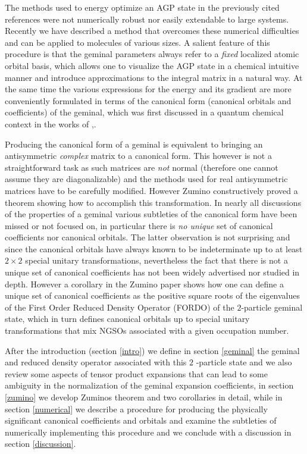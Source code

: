 \documentclass[aps,preprint]{revtex4}%
\begin{document}
The methods used to energy optimize an AGP state in the previously cited
references were not numerically robust nor easily extendable to large systems.
Recently we have \cite{Weiner&Ortiz02} described a method that overcomes these
numerical difficulties and can be applied to molecules of various sizes. A
salient feature of this procedure is that the geminal parameters always refer
to a \emph{fixed} localized atomic orbital basis, which allows one to
visualize the AGP state in a chemical intuitive manner and introduce
approximations to the integral matrix in a natural way. At the same time the
various expressions for the energy and its gradient are more conveniently
formulated in terms of the canonical form (canonical orbitals and
coefficients) of the geminal, which was first discussed in a quantum chemical
context in the works of \cite{Coleman63},\cite{Lowdin56}.

Producing the canonical form of a geminal is equivalent to bringing an
antisymmetric \emph{complex} matrix to a canonical form. This however is not a
straightforward task as such matrices are \emph{not }normal \cite{Encyclo}
(therefore one cannot assume they are diagonalizable) and the methods used for
real antisymmetric matrices have to be carefully modified. However Zumino
\cite{Zumino62} constructively proved a theorem showing how to accomplish this
transformation. In nearly all discussions of the properties of a geminal
various subtleties of the canonical form have been missed or not focused on,
in particular there is \emph{no unique} set of canonical coefficients nor
canonical orbitals. The latter observation is not surprising and since the
canonical orbitals have always known to be indeterminate up to at least
$2\times2$ special unitary transformations, nevertheless the fact that there
is not a unique set of canonical coefficients has not been widely advertised
nor studied in depth. However a corollary in the Zumino paper shows how one
can define a unique set of canonical coefficients as the positive square roots
of the eigenvalues of the First Order Reduced Density Operator (FORDO) of the
$2$-particle geminal state, which in turn defines canonical orbitals up to
special unitary transformations that mix NGSOs associated with a given
occupation number.

After the introduction (section \ref{intro}) we define in section
\ref{geminal} the geminal and reduced density operator associated with this
$2$ -particle state and we also review some aspects of tensor product
expansions that can lead to some ambiguity in the normalization of the geminal
expansion coefficients, in section \ref{zumino} we develop Zuminos theorem and
two corollaries in detail, while in section \ref{numerical} we describe a
procedure for producing the physically significant canonical coefficients and
orbitals and examine the subtleties of numerically implementing this procedure
and we conclude with a discussion in section \ref{discussion}.
\end{document}
